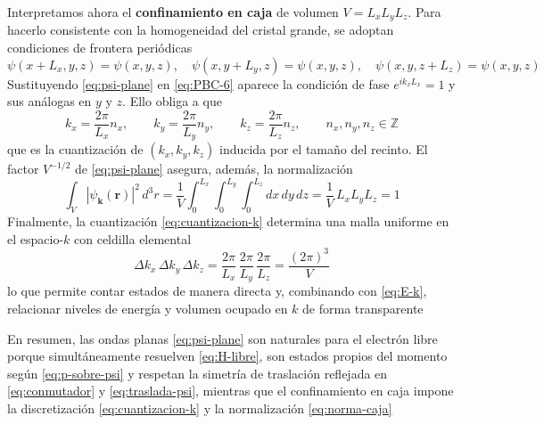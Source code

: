 \documentclass{article}
\begin{document}
Interpretamos ahora el \textcolor{Cerulean}{\textbf{confinamiento en caja}} de volumen $V=L_xL_yL_z$. Para hacerlo consistente con la homogeneidad del cristal grande, se adoptan condiciones de frontera periódicas
\begin{equation}\label{eq:PBC-6}
\psi(x+L_x,y,z)=\psi(x,y,z),\quad
\psi(x,y+L_y,z)=\psi(x,y,z),\quad
\psi(x,y,z+L_z)=\psi(x,y,z)
\end{equation}
Sustituyendo \eqref{eq:psi-plane} en \eqref{eq:PBC-6} aparece la condición de fase $e^{ik_xL_x}=1$ y sus análogas en $y$ y $z$. Ello obliga a que
\begin{equation}\label{eq:cuantizacion-k}
k_x=\frac{2\pi}{L_x}n_x,\qquad
k_y=\frac{2\pi}{L_y}n_y,\qquad
k_z=\frac{2\pi}{L_z}n_z,\qquad
n_x,n_y,n_z\in\mathbb Z
\end{equation}
que es la cuantización de $(k_x,k_y,k_z)$ inducida por el tamaño del recinto. El factor $V^{-1/2}$ de \eqref{eq:psi-plane} asegura, además, la normalización
\begin{equation}\label{eq:norma-caja}
\int_V |\psi_{\mathbf k}(\mathbf r)|^2\,d^3 r
=\frac{1}{V}\int_0^{L_x}\!\!\int_0^{L_y}\!\!\int_0^{L_z} dx\,dy\,dz
=\frac{1}{V}\,L_xL_yL_z
=1
\end{equation}
Finalmente, la cuantización \eqref{eq:cuantizacion-k} determina una malla uniforme en el espacio-$k$ con celdilla elemental
\begin{equation}\label{eq:celda-k-6}
\Delta k_x\,\Delta k_y\,\Delta k_z
=\frac{2\pi}{L_x}\,\frac{2\pi}{L_y}\,\frac{2\pi}{L_z}
=\frac{(2\pi)^3}{V}
\end{equation}
lo que permite contar estados de manera directa y, combinando con \eqref{eq:E-k}, relacionar niveles de energía y volumen ocupado en $k$ de forma transparente

En resumen, las ondas planas \eqref{eq:psi-plane} son naturales para el electrón libre porque simultáneamente resuelven \eqref{eq:H-libre}, son estados propios del momento según \eqref{eq:p-sobre-psi} y respetan la simetría de traslación reflejada en \eqref{eq:conmutador} y \eqref{eq:traslada-psi}, mientras que el confinamiento en caja impone la discretización \eqref{eq:cuantizacion-k} y la normalización \eqref{eq:norma-caja}
\end{document}
